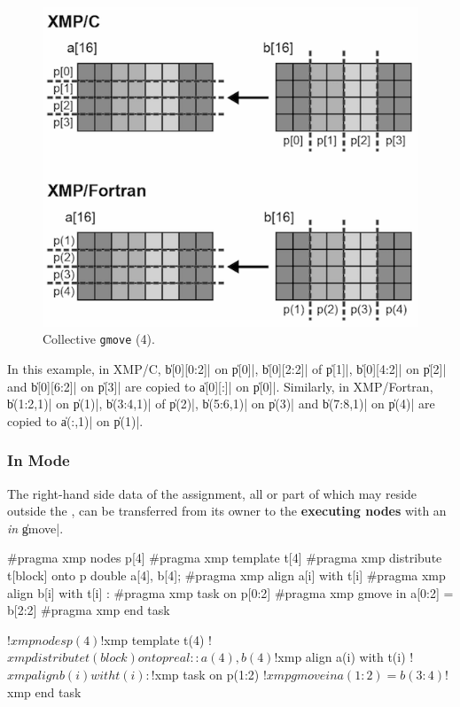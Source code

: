 \begin{figure}
  \centering
  \includegraphics[width=0.9\columnwidth]{figs/gmove_different.png}
  \caption{Collective {\tt gmove} (4).}
\end{figure}

In this example, in XMP/C, \|b[0][0:2]| on \|p[0]|, \|b[0][2:2]| of
\|p[1]|, \|b[0][4:2]| on \|p[2]| and \|b[0][6:2]| on \|p[3]| are copied
to \|a[0][:]| on \|p[0]|. Similarly, in XMP/Fortran, \|b(1:2,1)| on
\|p(1)|, \|b(3:4,1)| of \|p(2)|, \|b(5:6,1)| on \|p(3)| and \|b(7:8,1)|
on \|p(4)| are copied to \|a(:,1)| on \|p(1)|.


\subsubsection{In Mode}


The right-hand side data of the assignment, all or part of which may
reside outside the {\enset}, can be transferred from its owner
{\nodes} to the {\bf executing nodes} with an {\it in} \|gmove|.

\begin{XCexample}
#pragma xmp nodes p[4]
#pragma xmp template t[4]
#pragma xmp distribute t[block] onto p
double a[4], b[4];
#pragma xmp align a[i] with t[i]
#pragma xmp align b[i] with t[i]
   :
#pragma xmp task on p[0:2]
#pragma xmp gmove in
  a[0:2] = b[2:2]
#pragma xmp end task
\end{XCexample}

\begin{XFexample}
!$xmp nodes p(4)
!$xmp template t(4)
!$xmp distribute t(block) onto p
real :: a(4), b(4)
!$xmp align a(i) with t(i)
!$xmp align b(i) with t(i)
   :
!$xmp task on p(1:2)
!$xmp gmove in
  a(1:2) = b(3:4)
!$xmp end task
\end{XFexample}

